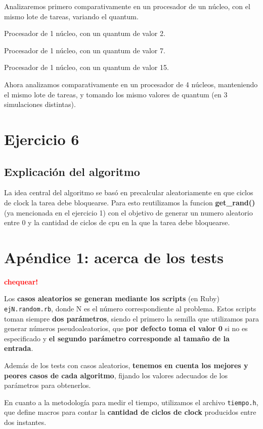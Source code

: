 \documentclass[a4paper]{article}
\begin{document}
Analizaremos primero comparativamente en un procesador de un núcleo, con el
mismo lote de tareas, variando el quantum.

Procesador de 1 núcleo, con un quantum de valor 2.

Procesador de 1 núcleo, con un quantum de valor 7.

Procesador de 1 núcleo, con un quantum de valor 15.

Ahora analizamos comparativamente en un procesador de 4 núcleos, manteniendo
el mismo lote de tareas, y tomando los mismo valores de quantum (en 3
simulaciones distintas).

\section{Ejercicio 6}

\subsection{Explicación del algoritmo}
La idea central del algoritmo se basó en precalcular aleatoriamente en que
ciclos de clock la tarea debe bloquearse. Para esto reutilizamos la funcion
\textbf{get\_rand()} (ya mencionada en el ejercicio 1) con el objetivo de
generar un numero aleatorio entre 0 y la cantidad de ciclos de cpu en la que
la tarea debe bloquearse.

\newpage

\section{Apéndice 1: acerca de los tests}


\textcolor{red}{\textbf{chequear!}} \medskip

Los \textbf{casos aleatorios se generan mediante los scripts} (en Ruby) \verb|ejN.random.rb|, donde
N es el número correspondiente al problema. Estos scripts toman siempre \textbf{dos parámetros},
siendo el primero la semilla que utilizamos para generar números pseudoaleatorios, que
\textbf{por defecto toma el valor 0} si no es especificado y \textbf{el segundo parámetro corresponde
al tamaño de la entrada}.

Además de los tests con casos aleatorios, \textbf{tenemos en cuenta los mejores y peores
casos de cada algoritmo}, fijando los valores adecuados de los parámetros para
obtenerlos. \medskip

En cuanto a la metodología para medir el tiempo, utilizamos el archivo \verb|tiempo.h|,
que define macros para contar la \textbf{cantidad de ciclos de clock} producidos entre dos instantes. \medskip
\end{document}
